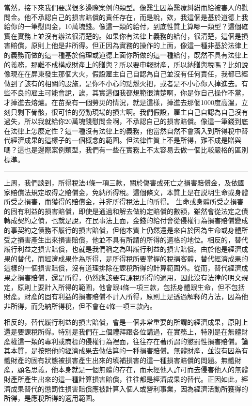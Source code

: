 \documentclass[oneside,sub3section]{ctexbook}
\begin{document}
當然，接下來我們要講很多邊際案例的類型。像醫生因為醫療糾紛而給被害人的慰問金。他不承認自己的損害賠償的責任存在，而是說，欸，我這個是基於道德上我給你的一筆慰問金，10萬塊錢。像這一類的給付，到底性質上算哪一類型？這個確實在實務上並沒有辦法很清楚的。如果你有法律上義務的給付，很清楚，這個是損害賠償，原則上他是非所得。但正因為實務的操作的上面，像這一種非基於法律上的義務而做的這一種基於倫理或道德上面你所做的這一種給付，既然不具有法律上的義務，那難不成構成財產上的贈與？所以要申報財產，所以納贈與稅嗎？比如說像現在在屏東發生那個大火，假設雇主自己自認為自己並沒有任何責任，我都已經做到了該有的相關的設施，是你不小心的點燃火把，或者是不小心你人掉進去。有些不良的雇主可能會說，誒，其實這個我都規範很清楚啊，你是你自己操作不當，才掉進去熔爐。在苗栗有一個勞災的情況，就是這樣，掉進去那個1000度高溫，立刻只剩下骨骸，很可怕的勞動現場的損害啊。我們假設，雇主自己自認為自己沒有過失，所以我就給你20萬塊錢慰問金啊，不承認自己的損害賠償。像這一筆錢到底在法律上怎麼定性？這一種沒有法律上的義務，他當然自然不會落入到所得稅中替代經濟成果的這樣子的一個概念的範圍。但法律性質上不是所得，難不成是贈與嗎？這也是邊際案例類型，我們有一些在實務上不太容易去做一個比較嚴格的區別標準。

\begin{center}\rule{0.5\linewidth}{0.5pt}\end{center}

上周，我們談到，所得稅法4條一項三款，關於傷害或死亡之損害賠償金，及依國家賠償法規定取得之賠償金，免納所得稅。這個條文，本質上是在説明生命或身體所受之損害，而獲得的賠償金，并非所得稅法上的所得。
生命或身體所受之損害的固有利益的損害賠償，即使是通過和解去做約定賠償的數額，雖然會從法定之債轉成契約之債，也就是說，在民事法上面，金錢的給付會從侵權行為損害賠償變成的事契約之債務不履行的損害賠償，但他本質上仍然還是來自於因為生命或身體所受之損害產生出來損害賠償，他並不具有所謂的所得的適格的地位。相反的，替代履行利益之損害賠償，也就是我們稱之為叫履行利益的損害賠償。由於他是經濟成果的替代，而經濟成果作為所得，是所得稅所要掌握的稅捐客體，替代經濟成果的這樣的一個損害賠償，沒有道理排除在課稅所得的計算範圍外。從而，替代經濟成果之損害賠償，還是所得，仍然應該要有課稅所得的適用，因此沒有法律的明文規定，原則上要計入所得的範圍，他會跟4條一項三款，包括身體跟生命，但不包括財產。財產的固有利益的損害賠償不計入所得，原則上是透過解釋的方法，因為他非所得，而免納所得稅，但不會在4條一項三款內。

相反的，替代履行利益的損害賠償，會是一個非常重要的所謂的經濟成果，原則上還是要課稅所得。特別是我們在上個禮拜跟各位講過，在實務上，特別是在無體財產權這一類的專利或商標的侵權行為裡面，往往存在著所謂的懲罰性損害賠償。論其本質，是按照他的經濟成果去做估算的一種損害賠償。無體財產，並沒有因為有體財產的固有狀態被損害產生出來的填補損害的這一種損害賠償的問題。無體財產，顧名思義，他本身就是一個無體的存在，而未經他人許可而去侵害他人的無體財產所產生出來的這一種計算損害賠償，往往都是經濟成果的替代。正因如此，經濟成果替代的懲罰性損害賠償應被計算入個人或營利事業，因為經濟活動所獲得的所得，是應稅所得的適用範圍。
\end{document}
